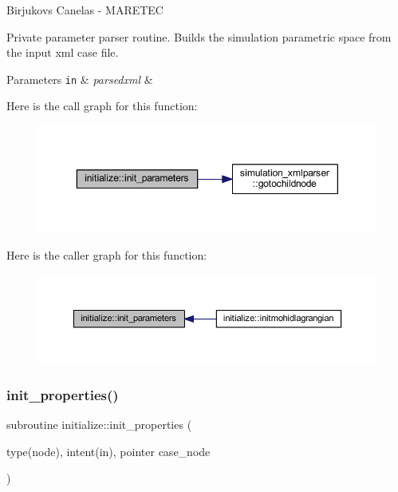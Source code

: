Birjukovs Canelas -\/ M\+A\+R\+E\+T\+EC 

Private parameter parser routine. Builds the simulation parametric space from the input xml case file. 
\begin{DoxyParams}[1]{Parameters}
\mbox{\tt in}  & {\em parsedxml} & \\
\hline
\end{DoxyParams}
Here is the call graph for this function\+:\nopagebreak
\begin{figure}[H]
\begin{center}
\leavevmode
\includegraphics[width=350pt]{namespaceinitialize_a7a54dc126f448bea2b566339a449f85c_cgraph}
\end{center}
\end{figure}
Here is the caller graph for this function\+:\nopagebreak
\begin{figure}[H]
\begin{center}
\leavevmode
\includegraphics[width=350pt]{namespaceinitialize_a7a54dc126f448bea2b566339a449f85c_icgraph}
\end{center}
\end{figure}
\mbox{\label{namespaceinitialize_a4640ad15e29b88467ec842f274f64b62}} 
\subsubsection{\texorpdfstring{init\+\_\+properties()}{init\_properties()}}
{\footnotesize\ttfamily subroutine initialize\+::init\+\_\+properties (\begin{DoxyParamCaption}\item[{type(node), intent(in), pointer}]{case\+\_\+node }\end{DoxyParamCaption})\hspace{0.3cm}{\ttfamily [private]}}



